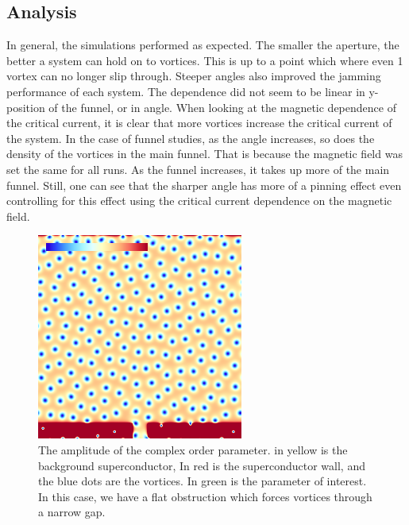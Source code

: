 \subsection{Analysis}
In general, the simulations performed as expected. The smaller the aperture, the better a system can hold on to vortices. This is up to a point which where even 1 vortex can no longer slip through. Steeper angles also improved the jamming performance of each system. The dependence did not seem to be linear in y-position of the funnel, or in angle. When looking at the magnetic dependence of the critical current, it is clear that more vortices increase the critical current of the system. In the case of funnel studies, as the angle increases, so does the density of the vortices in the main funnel. That is because the magnetic field was set the same for all runs. As the funnel increases, it takes up more of the main funnel. Still, one can see that the sharper angle has more of a pinning effect even controlling for this effect using the critical current dependence on the magnetic field. 
\begin{figure}[htbp]
\begin{center}
\includegraphics[scale=.50]{ratchetNoAngle.png}
\caption{ The amplitude of the complex order parameter. in yellow is the background superconductor, In red is the superconductor wall, and the blue dots are the vortices. In green is the parameter of interest. In this case, we have a flat obstruction which forces vortices through a narrow gap.}
\label{noAngle}
\end{center}
\end{figure}

